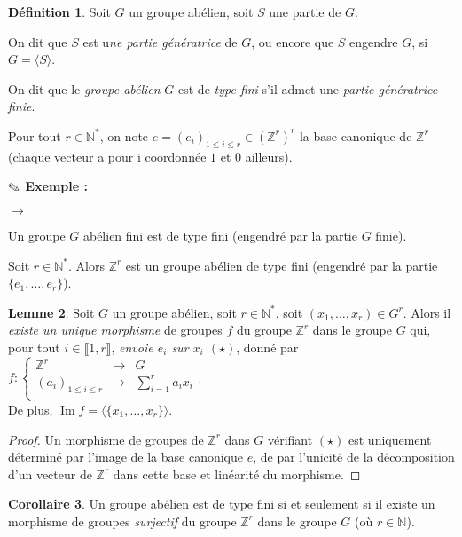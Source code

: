 \documentclass{report}
\newcommand{\Z}{\mathbb{Z}}
\newcommand{\N}{\mathbb{N}}
\newcommand{\im}{\mathop{\mathrm{Im}}\nolimits}
\newcommand{\dis}{\displaystyle}
\newenvironment{ls}{\begin{list}{$\to$}{}}{\end{list}}
\newcommand{\nt}[1]{\llbracket  #1 \rrbracket }
\theoremstyle{definition}
\newtheorem{defi}{Définition}[chapter]
\newtheorem{lem}[defi]{Lemme}
\newtheorem{coro}[defi]{Corollaire}
\theoremstyle{remark}
\newcommand{\exem}{{\textbf{$\text{\ding{46}}$ Exemple : \ }}}
\newcommand{\app}[5]{#1:\left\{\begin{array}{ccl}
#2 & \longrightarrow & #3 \\
#4 & \longmapsto & #5  \\
\end{array}\right.
}
\begin{document}
\begin{defi}
Soit $G$ un groupe abélien, soit $S$ une partie de $G$. 
\begin{point}
\item On dit que $S$ est u\textit{ne partie génératrice} de $G$, ou encore que $S$ engendre $G$, si $G=\langle S\rangle$.
\item On dit que le \textit{groupe abélien} $G$ est de \textit{type fini} s'il admet une \textit{partie génératrice finie}. 
\end{point}
\end{defi}

Pour tout $r \in \N^*$, on note $e=(e_i)_{1 \leqslant i \leqslant r} \in \left(\Z^r\right)^r$ la base canonique de $\Z^r$ (chaque vecteur a pour i coordonnée $1$ et $0$ ailleurs).

\exem
\begin{ls}
\item Un groupe $G$ abélien fini est de type fini (engendré par la partie $G$ finie).
\item Soit $r \in \N^*$. Alors $\Z^r$ est un groupe abélien de type fini (engendré par la partie $\{e_1, \ldots, e_r \}$).
\end{ls}
\begin{lem}\label{morphisme-Zr-G}
Soit $G$ un groupe abélien, soit $r \in \N^*$, soit $(x_1, \ldots, x_r) \in G^r$. Alors il \textit{existe un unique morphisme} de groupes $f$ du groupe $\Z^r$ dans le groupe $G$ qui, pour tout $i \in \nt{1,r}$, \textit{envoie $e_i$ sur $x_i$ $(\star)$}, donné par $\app{f}{\Z^r}{G}{(a_i)_{1 \leqslant i \leqslant r}}{\dis \sum_{i=1}^ra_ix_i}$. \\ De plus, $\im f =\langle\{x_1, \ldots, x_r\}\rangle$.
\end{lem}

\begin{proof}
Un morphisme de groupes de $\Z^r$ dans $G$ vérifiant $(\star)$ est uniquement déterminé par l'image de la base canonique $e$, de par l'unicit\'e de la décomposition d'un vecteur de $\Z^r$ dans cette base et linéarité du morphisme.
\end{proof}

\begin{coro}\label{type-fini-et-Zr}
Un groupe abélien est de type fini si et seulement si il existe un morphisme de groupes \textit{surjectif} du groupe $\Z^r$ dans le groupe $G$ (où $r \in \N$).
\end{coro}
\end{document}
